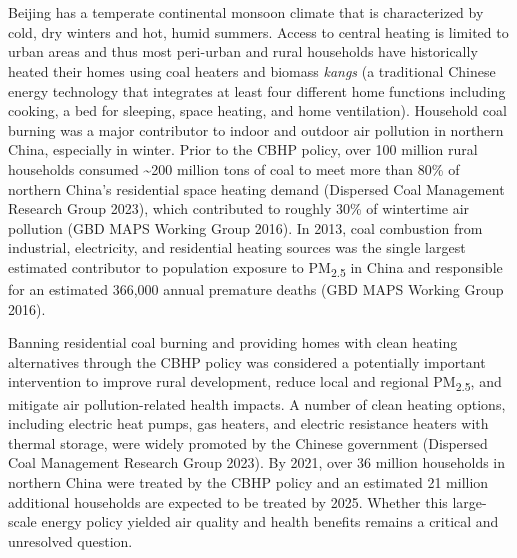 \documentclass[
  letterpaper,
  DIV=11,
  numbers=noendperiod]{scrartcl}
\providecommand{\DIFadd}[1]{{\protect\color{blue}\uwave{#1}}} %
\providecommand{\DIFaddbegin}{} %
\providecommand{\DIFaddend}{} %
\providecommand{\DIFdelbegin}{} %
\providecommand{\DIFdelend}{} %
\newcommand{\DIFscaledelfig}{0.5}
\newlength{\DIFdelgraphicswidth} %
\newlength{\DIFdelgraphicsheight} %
\newcommand{\DIFaddincludegraphics}[2][]{{\color{blue}\fbox{\DIFOincludegraphics[#1]{#2}}}} %
\newcommand{\DIFdelincludegraphics}[2][]{%
\sbox{\DIFdelgraphicsbox}{\DIFOincludegraphics[#1]{#2}}%
\settoboxwidth{\DIFdelgraphicswidth}{\DIFdelgraphicsbox} %
\settoboxtotalheight{\DIFdelgraphicsheight}{\DIFdelgraphicsbox} %
\scalebox{\DIFscaledelfig}{%
\parbox[b]{\DIFdelgraphicswidth}{\usebox{\DIFdelgraphicsbox}\\[-\baselineskip] \rule{\DIFdelgraphicswidth}{0em}}\llap{\resizebox{\DIFdelgraphicswidth}{\DIFdelgraphicsheight}{%
\setlength{\unitlength}{\DIFdelgraphicswidth}%
\begin{picture}(1,1)%
\thicklines\linethickness{2pt} %
{\color[rgb]{1,0,0}\put(0,0){\framebox(1,1){}}}%
{\color[rgb]{1,0,0}\put(0,0){\line( 1,1){1}}}%
{\color[rgb]{1,0,0}\put(0,1){\line(1,-1){1}}}%
\end{picture}%
}\hspace*{3pt}}} %
} %
\DeclareRobustCommand{\DIFaddbegin}{\DIFOaddbegin \let\includegraphics\DIFaddincludegraphics} %
\DeclareRobustCommand{\DIFaddend}{\DIFOaddend \let\includegraphics\DIFOincludegraphics} %
\DeclareRobustCommand{\DIFdelbegin}{\DIFOdelbegin \let\includegraphics\DIFdelincludegraphics} %
\DeclareRobustCommand{\DIFdelend}{\DIFOaddend \let\includegraphics\DIFOincludegraphics} %
\begin{document}
\DIFdelbegin %
\DIFdelend \DIFaddbegin \section{\DIFadd{Background}}\label{background}
\DIFaddend 

\DIFdelbegin %
\DIFdelend \DIFaddbegin \subsection{\DIFadd{Context for the policy}}\label{context-for-the-policy}
\DIFaddend 

Beijing has a temperate continental monsoon climate that is
characterized by cold, dry winters and hot, humid summers. Access to
central heating is limited to urban areas and thus most peri-urban and
rural households have historically heated their homes using coal heaters
and biomass \emph{kangs} (a traditional Chinese energy technology that
integrates at least four different home functions including cooking, a
bed for sleeping, space heating, and home ventilation). Household coal
burning was a major contributor to indoor and outdoor air pollution in
northern China, especially in winter. Prior to the CBHP policy, over 100
million rural households consumed \textasciitilde200 million tons of
coal to meet more than 80\% of northern China's residential space
heating demand (Dispersed Coal Management Research Group 2023), which
contributed to roughly 30\% of wintertime air pollution (GBD MAPS
Working Group 2016). In 2013, coal combustion from industrial,
electricity, and residential heating sources was the single largest
estimated contributor to population exposure to PM\textsubscript{2.5} in
China and responsible for an estimated 366,000 annual premature deaths
(GBD MAPS Working Group 2016).

Banning residential coal burning and providing homes with clean heating
alternatives through the CBHP policy was considered a potentially
important intervention to improve rural development, reduce local and
regional PM\textsubscript{2.5}, and mitigate air pollution-related
health impacts. A number of clean heating options, including electric
heat pumps, gas heaters, and electric resistance heaters with thermal
storage, were widely promoted by the Chinese government (Dispersed Coal
Management Research Group 2023). By 2021, over 36 million households in
northern China were treated by the CBHP policy and an estimated 21
million additional households are expected to be treated by 2025.
Whether this large-scale energy policy yielded air quality and health
benefits remains a critical and unresolved question.
\end{document}
